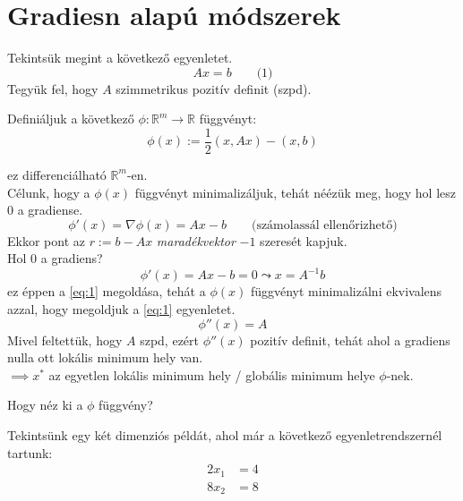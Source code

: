 \chapter{Gradiesn alapú módszerek}
Tekintsük megint a következő egyenletet.
\begin{equation*}
    Ax = b \qquad \text{(1)}
\end{equation*}
Tegyük fel, hogy $A$ szimmetrikus pozitív definit (szpd).

\begin{definition}
    Definiáljuk a következő $\phi : \mathbb{R}^{m} \to \mathbb{R}$ függvényt:
    \begin{equation*}
        \phi(x) := \frac{1}{2}(x, Ax) - (x, b)
    \end{equation*}
\end{definition}
ez differenciálható $\mathbb{R}^{m}$-en. \\
Célunk, hogy a $\phi(x)$ függvényt minimalizáljuk, tehát néézük meg, hogy hol lesz $0$ a gradiense.
\begin{equation*}
    \phi'(x) = \nabla \phi(x) = Ax - b \qquad \text{(számolassál ellenőrizhető)}
\end{equation*}
Ekkor pont az $r := b - Ax$ \textit{maradékvektor} $-1$ szeresét kapjuk. \\
Hol $0$ a gradiens?
\begin{equation*}
    \phi'(x) = Ax - b = 0 \leadsto x = A^{-1}b
\end{equation*}
ez éppen a \ref{eq:1} megoldása, tehát a $\phi(x)$ függvényt minimalizálni ekvivalens azzal, hogy megoldjuk a \ref{eq:1} egyenletet.
\begin{equation*}
    \phi''(x) = A
\end{equation*}
Mivel feltettük, hogy $A$ szpd, ezért $\phi''(x)$ pozitív definit, tehát ahol a gradiens nulla ott lokális minimum hely van. \\
$\implies x^{*}$ az egyetlen lokális minimum hely / globális minimum helye $\phi$-nek.

\begin{kerdes}
    Hogy néz ki a $\phi$ függvény?
\end{kerdes}

\begin{pelda}
    Tekintsünk egy két dimenziós példát, ahol már a következő egyenletrendszernél tartunk:
    \begin{align*}
        2x_{1} & = 4 \\
        8x_{2} & = 8
    \end{align*}
\end{pelda}

